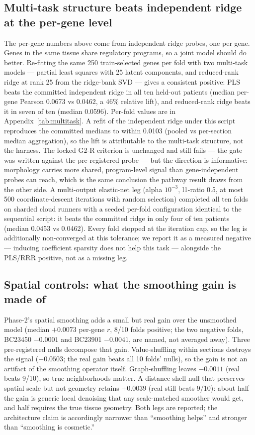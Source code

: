 \documentclass[11pt]{article}
\begin{document}
\subsection{Multi-task structure beats independent ridge at the per-gene level}
The per-gene numbers above come from independent ridge probes, one per gene. Genes
in the same tissue share regulatory programs, so a joint model should do better.
Re-fitting the same 250 train-selected genes per fold with two multi-task models
--- partial least squares with 25 latent components, and reduced-rank ridge at
rank 25 from the ridge-bank SVD --- gives a consistent positive: PLS beats the
committed independent ridge in all ten held-out patients (median per-gene Pearson
0.0673 vs 0.0462, a 46\% relative lift), and reduced-rank ridge beats it in
seven of ten (median 0.0596). Per-fold values are in
Appendix~\ref{tab:multitask}. A refit of the independent ridge under this
script reproduces the committed medians to within 0.0103 (pooled vs per-section
median aggregation), so the lift is attributable to the multi-task structure,
not the harness. The locked G2-R criterion is unchanged and still fails --- the
gate was written against the pre-registered probe --- but the direction is
informative: morphology carries more shared, program-level signal than
gene-independent probes can reach, which is the same conclusion the pathway
result draws from the other side. A multi-output elastic-net leg (alpha $10^{-3}$,
l1-ratio 0.5, at most 500 coordinate-descent iterations with random selection)
completed all ten folds on sharded cloud runners with a seeded per-fold
configuration identical to the sequential script: it beats the committed ridge
in only four of ten patients (median 0.0453 vs 0.0462). Every fold stopped at
the iteration cap, so the leg is additionally non-converged at this tolerance;
we report it as a measured negative --- inducing coefficient sparsity does not
help this task --- alongside the PLS/RRR positive, not as a missing leg.

\subsection{Spatial controls: what the smoothing gain is made of}
Phase-2's spatial smoothing adds a small but real gain over the unsmoothed
model (median $+0.0073$ per-gene $r$, 8/10 folds positive; the two negative
folds, BC23450 $-0.0001$ and BC23901 $-0.0041$, are named, not averaged away).
Three pre-registered nulls decompose that gain. Value-shuffling within
sections destroys the signal ($-0.0503$; the real gain beats all 10 folds'
nulls), so the gain is not an artifact of the smoothing operator itself.
Graph-shuffling leaves $-0.0011$ (real beats 9/10), so true neighborhoods
matter. A distance-shell null that preserves spatial scale but not geometry
retains $+0.0039$ (real still beats 9/10): about half the gain is generic
local denoising that any scale-matched smoother would get, and half requires
the true tissue geometry. Both legs are reported; the architecture claim is
accordingly narrower than ``smoothing helps'' and stronger than ``smoothing is
cosmetic.''
\end{document}
